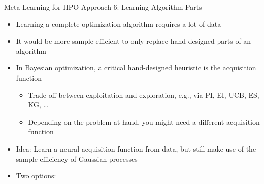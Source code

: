 \begin{frame}[c]{Meta-Learning for HPO Approach 6: Learning Algorithm Parts}

\begin{itemize}
	\item Learning a complete optimization algorithm  \alert{requires a lot of data}
	\item It would be more \alert{sample-efficient} to \alert{only replace hand-designed parts} of an algorithm

\bigskip
\fhpause
	\item In Bayesian optimization, a critical hand-designed heuristic is the acquisition function
	\begin{itemize}
		\item Trade-off between exploitation and exploration, e.g., via PI, EI, UCB, ES, KG, \dots 
		\item Depending on the problem at hand, you might need a different acquisition function
	\end{itemize}
\fhpause
\smallskip

    \item \alert{Idea:} Learn a \alert{neural acquisition function} from data, but still make use of the sample efficiency of Gaussian processes 

\fhpause
\medskip
    \item Two options:

\end{itemize}


\end{frame}

